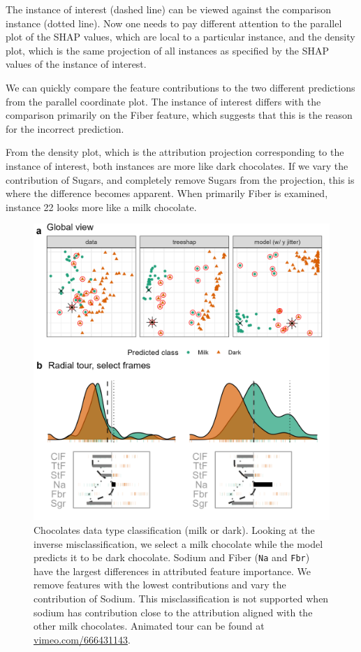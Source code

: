 \documentclass[
]{article}
\begin{document}
The instance of interest (dashed line) can be viewed against the comparison instance (dotted line). Now one needs to pay different attention to the parallel plot of the SHAP values, which are local to a particular instance, and the density plot, which is the same projection of all instances as specified by the SHAP values of the instance of interest.

We can quickly compare the feature contributions to the two different predictions from the parallel coordinate plot. The instance of interest differs with the comparison primarily on the Fiber feature, which suggests that this is the reason for the incorrect prediction.

From the density plot, which is the attribution projection corresponding to the instance of interest, both instances are more like dark chocolates. If we vary the contribution of Sugars, and completely remove Sugars from the projection, this is where the difference becomes apparent. When primarily Fiber is examined, instance 22 looks more like a milk chocolate.



\begin{figure}

{\centering \includegraphics[width=1\linewidth]{./figures/case_chocolates_inverse} 

}

\caption{Chocolates data type classification (milk or dark). Looking at the inverse misclassification, we select a milk chocolate while the model predicts it to be dark chocolate. Sodium and Fiber (\texttt{Na} and \texttt{Fbr}) have the largest differences in attributed feature importance. We remove features with the lowest contributions and vary the contribution of Sodium. This misclassification is not supported when sodium has contribution close to the attribution aligned with the other milk chocolates. Animated tour can be found at \href{https://vimeo.com/666431143}{vimeo.com/666431143}.}\label{fig:casechocolatesinverse}
\end{figure}
\end{document}
